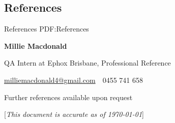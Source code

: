 \documentclass[a4paper,10pt,oneside]{article}
\newcommand{\CVNote}{This document is accurate as of {\today}}
\begin{document}
\begin{body}
\section
{References}
{References}
{PDF:References}

\textbf{Millie Macdonald}
\par QA Intern at Ephox Brisbane, Professional Reference
\begin{detail}
\href{mailto:milliemacdonald4@gmail.com}
{milliemacdonald4@gmail.com}
\,\BulletSymbol\,
0455 741 658
\end{detail}

\EntryGap

\par Further references available upon request





\end{body}


\begin{flushright}
\scriptsize%
[\textit{\CVNote}]%
\hspace{2.0mm}\null
\end{flushright}

\label{LastPage}~
\end{document}
